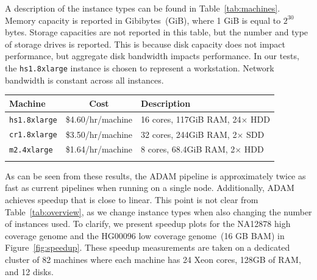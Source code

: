 \documentclass{bioinfo}
\begin{document}
A description of the instance types can be found in Table~\ref{tab:machines}. Memory capacity is reported in Gibibytes~(GiB), where 1 GiB is equal to $2^{30}$ bytes. Storage
capacities are not reported in this table, but the number and type of storage drives is reported. This is because disk capacity does not impact performance, but aggregate
disk bandwidth impacts performance. In our tests, the \texttt{hs1.8xlarge} instance is chosen to represent a workstation. Network bandwidth is constant across all instances.

\begin{table}[h]
{\begin{tabular}{ l c l }
\toprule
\bf Machine & \bf Cost & \bf Description \\
\midrule
\texttt{hs1.8xlarge} & \$4.60/hr/machine & 16 cores, 117GiB RAM, 24$\times$ HDD \\
\texttt{cr1.8xlarge} & \$3.50/hr/machine & 32 cores, 244GiB RAM, 2$\times$ SDD \\
\texttt{m2.4xlarge} & \$1.64/hr/machine & 8 cores, 68.4GiB RAM, 2$\times$ HDD \\
\botrule
\end{tabular}}{}
\end{table}

As can be seen from these results, the ADAM pipeline is approximately twice as fast as current pipelines when running on a single node. Additionally, ADAM achieves
speedup that is close to linear. This point is not clear from Table~\ref{tab:overview}, as we change instance types when also changing the number of instances used. To clarify,
we present speedup plots for the NA12878 high coverage genome and the HG00096 low coverage genome~(16 GB BAM) in Figure~\ref{fig:speedup}. These speedup
measurements are taken on a dedicated cluster of 82 machines where each machine has 24 Xeon cores, 128GB of RAM, and 12 disks.
\end{document}
